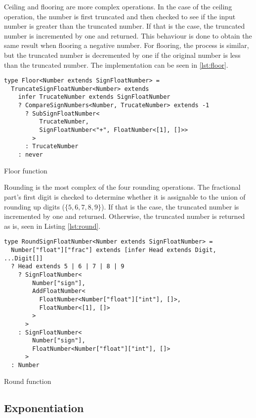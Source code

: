 Ceiling and flooring are more complex operations. In the case of the ceiling operation, the number is first truncated and then checked to see if the input number is greater than the truncated number. If that is the case, the truncated number is incremented by one and returned. This behaviour is done to obtain the same result when flooring a negative number. For flooring, the process is similar, but the truncated number is decremented by one if the original number is less than the truncated number. The implementation can be seen in \ref{lst:floor}.

\begin{listing}[ht]
  \begin{verbatim}
type Floor<Number extends SignFloatNumber> =
  TruncateSignFloatNumber<Number> extends 
    infer TrucateNumber extends SignFloatNumber
    ? CompareSignNumbers<Number, TrucateNumber> extends -1
      ? SubSignFloatNumber<
          TrucateNumber,
          SignFloatNumber<"+", FloatNumber<[1], []>>
        >
      : TrucateNumber
    : never
\end{verbatim}
  \caption{Floor function}\label{lst:floor}
\end{listing}

Rounding is the most complex of the four rounding operations. The fractional part's first digit is checked to determine whether it is assignable to the union of rounding up digits ($\{ 5,6,7,8,9 \}$). If that is the case, the truncated number is incremented by one and returned. Otherwise, the truncated number is returned as is, seen in Listing \ref{lst:round}.

\begin{listing}[ht]
  \begin{verbatim}
type RoundSignFloatNumber<Number extends SignFloatNumber> =
  Number["float"]["frac"] extends [infer Head extends Digit, ...Digit[]]
  ? Head extends 5 | 6 | 7 | 8 | 9
    ? SignFloatNumber<
        Number["sign"],
        AddFloatNumber<
          FloatNumber<Number["float"]["int"], []>,
          FloatNumber<[1], []>
        >
      >
    : SignFloatNumber<
        Number["sign"], 
        FloatNumber<Number["float"]["int"], []>
      >
  : Number
\end{verbatim}
  \caption{Round function}\label{lst:round}
\end{listing}

\subsection{Exponentiation}

